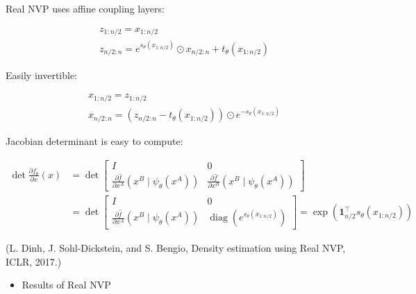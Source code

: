 \documentclass{report}
\begin{document}
\begin{definition}
    Real NVP uses affine coupling layers:

    $$
    \begin{aligned}
    & z_{1: n / 2}=x_{1: n / 2} \\
    & z_{n / 2: n}=e^{s_{\theta}\left(x_{1: n / 2}\right)} \odot x_{n / 2: n}+t_{\theta}\left(x_{1: n / 2}\right)
    \end{aligned}
    $$

    Easily invertible:

    $$
    \begin{aligned}
    & x_{1: n / 2}=z_{1: n / 2} \\
    & x_{n / 2: n}=\left(z_{n / 2: n}-t_{\theta}\left(x_{1: n / 2}\right)\right) \odot e^{-s_{\theta}\left(x_{1: n / 2}\right)}
    \end{aligned}
    $$

    Jacobian determinant is easy to compute:

    $$
    \begin{aligned}
    \operatorname{det} \frac{\partial f_{\theta}}{\partial x}(x) & =\operatorname{det}\left[\begin{array}{cc}
    I & 0 \\
    \frac{\partial \hat{f}}{\partial x^{A}}\left(x^{B} \mid \psi_{\theta}\left(x^{A}\right)\right) & \frac{\partial \hat{f}}{\partial x^{B}}\left(x^{B} \mid \psi_{\theta}\left(x^{A}\right)\right)
    \end{array}\right] \\
    & =\operatorname{det}\left[\begin{array}{cc}
    I & 0 \\
    \frac{\partial \hat{f}}{\partial x^{A}}\left(x^{B} \mid \psi_{\theta}\left(x^{A}\right)\right) & \operatorname{diag}\left(e^{s_{\theta}\left(x_{1: n / 2}\right)}\right)
    \end{array}\right]=\exp \left(\mathbf{1}_{n / 2}^{\top} s_{\theta}\left(x_{1: n / 2}\right)\right)
    \end{aligned}
    $$

    (L. Dinh, J. Sohl-Dickstein, and S. Bengio, Density estimation using Real NVP, ICLR, 2017.)
\end{definition}

\begin{itemize}
    \item Results of Real NVP
\end{itemize}
\end{document}

